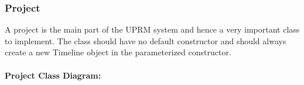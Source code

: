 \subsubsection{Project}
A project is the main part of the UPRM system and hence a very important class to implement. The class should have no default constructor and should always create a new Timeline object in the parameterized constructor.\\ \\
\textbf{Project Class Diagram:}\\
\centerline{}